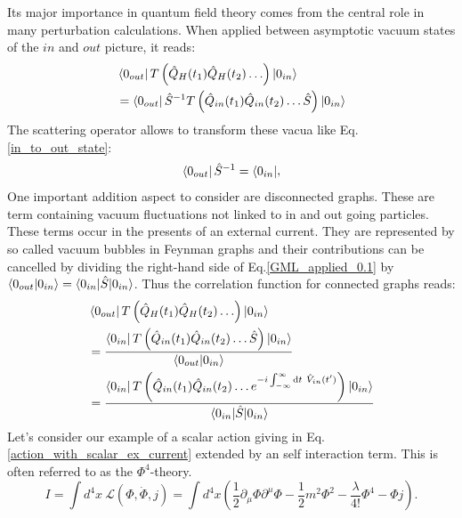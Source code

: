 \documentclass[12pt, titlepage]{article}
\begin{document}
Its major importance in quantum field theory comes from the central role in many perturbation calculations. When applied between asymptotic vacuum states of the $ in $ and $ out $ picture, it reads:
\begin{equation}\label{GML_applied_0.1}
\begin{split}
&\bra{0_{out}}
T\left( 
\hat{Q}_{H}(t_1)
\hat{Q}_{H}(t_2)
\ldots
\right) 
\ket{0_{in}}
\\
&=
\bra{0_{out}}
\hat{S}^{-1}
T\left( 
\hat{Q}_{in}(t_{1})
\hat{Q}_{in}(t_{2})
\ldots
\hat{S}
\right)
\ket{0_{in}}
\end{split}
\end{equation}
The scattering operator allows to transform these vacua like Eq.\enskip\eqref{in_to_out_state}:
\begin{equation}\label{S_on_state}
\begin{split}
\bra{0_{out}}
\hat{S}^{-1}
=
\bra{0_{in}}
\end{split},
\end{equation}
One important addition aspect to consider are disconnected graphs. These are term containing vacuum fluctuations not linked to in and out going particles. These terms occur in the presents of an external current. They are represented by so called vacuum bubbles in Feynman graphs and their contributions can be cancelled by dividing the right-hand side of Eq.\enskip\eqref{GML_applied_0.1} by $ \braket{0_{out}|0_{in}} = \braket{0_{in}|\hat{S}|0_{in}} $. Thus the correlation function for connected graphs reads:
\begin{equation}\label{GML_applied_1}
\begin{split}
&\bra{0_{out}}
T\left( 
\hat{Q}_{H}(t_1)
\hat{Q}_{H}(t_2)
\ldots
\right) 
\ket{0_{in}}
\\
&=\dfrac{
\bra{0_{in}}
T\left( 
\hat{Q}_{in}(t_{1})
\hat{Q}_{in}(t_{2})
\ldots
\hat{S}
\right)
\ket{0_{in}}
}{\braket{0_{out}|0_{in}}}
\\
&=\dfrac{
\bra{0_{in}}
T\left( 
\hat{Q}_{in}(t_{1})
\hat{Q}_{in}(t_{2})
\ldots
e^{-i\int_{-\infty}^{\infty}\mathrm{d}t\ \hat{V}_{in}(t^{\prime})}
\right)
\ket{0_{in}}
}{\braket{0_{in}|\hat{S}|0_{in}}}
\end{split}
\end{equation}
Let's consider our example of a scalar action giving in Eq.\enskip\eqref{action_with_scalar_ex_current} extended by an self interaction term. This is often referred to as the $ \Phi^{4}$-theory.
\begin{equation}\label{action_with_scalar_ex_current_self_inter}
I=\int d^{4}x \ \mathcal{L}(\Phi, \dot{\Phi},j)=
\int d^{4}x 
\left(
\frac{1}{2}\partial_{\mu}\Phi\partial^{\mu}\Phi
-\frac{1}{2}m^{2}\Phi^{2}
-\frac{\lambda}{4!}\Phi^{4}
-\Phi j
 \right)
 .
\end{equation} 
\end{document}
